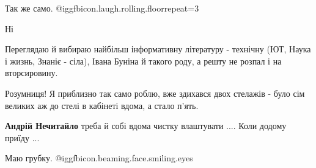 \begin{itemize}
Так же само. @igg{fbicon.laugh.rolling.floor}{repeat=3} 

 
Ні

 

Переглядаю й вибираю найбільш інформативну літературу - технічну (ЮТ, Наука і
жизнь, Знаніє - сіла), Івана Буніна й такого роду, а решту не розпал і на
вторсировину.


 

Розумниця! Я приблизно так само роблю, вже здихався двох стелажів - було сім
великих аж до стелі в кабінеті вдома, а стало п'ять.

\begin{itemize}
 
\textbf{Андрій Нечитайло} треба й собі вдома чистку влаштувати .... Коли додому приїду ...
\end{itemize}

 
Маю грубку. @igg{fbicon.beaming.face.smiling.eyes} 

 

\end{itemize}
